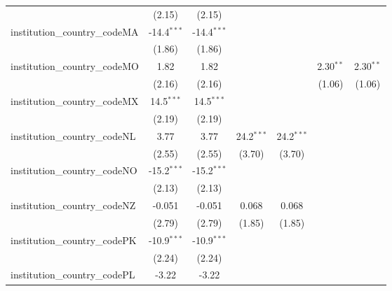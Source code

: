 \begin{tabular}{lcccccc}
                                         & (2.15)        & (2.15)        &               &               &               &   \\   
   institution\_country\_codeMA          & -14.4$^{***}$ & -14.4$^{***}$ &               &               &               &   \\   
                                         & (1.86)        & (1.86)        &               &               &               &   \\   
   institution\_country\_codeMO          & 1.82          & 1.82          &               &               & 2.30$^{**}$   & 2.30$^{**}$\\   
                                         & (2.16)        & (2.16)        &               &               & (1.06)        & (1.06)\\   
   institution\_country\_codeMX          & 14.5$^{***}$  & 14.5$^{***}$  &               &               &               &   \\   
                                         & (2.19)        & (2.19)        &               &               &               &   \\   
   institution\_country\_codeNL          & 3.77          & 3.77          & 24.2$^{***}$  & 24.2$^{***}$  &               &   \\   
                                         & (2.55)        & (2.55)        & (3.70)        & (3.70)        &               &   \\   
   institution\_country\_codeNO          & -15.2$^{***}$ & -15.2$^{***}$ &               &               &               &   \\   
                                         & (2.13)        & (2.13)        &               &               &               &   \\   
   institution\_country\_codeNZ          & -0.051        & -0.051        & 0.068         & 0.068         &               &   \\   
                                         & (2.79)        & (2.79)        & (1.85)        & (1.85)        &               &   \\   
   institution\_country\_codePK          & -10.9$^{***}$ & -10.9$^{***}$ &               &               &               &   \\   
                                         & (2.24)        & (2.24)        &               &               &               &   \\   
   institution\_country\_codePL          & -3.22         & -3.22         &               &               &               &   \\   

\end{tabular}
